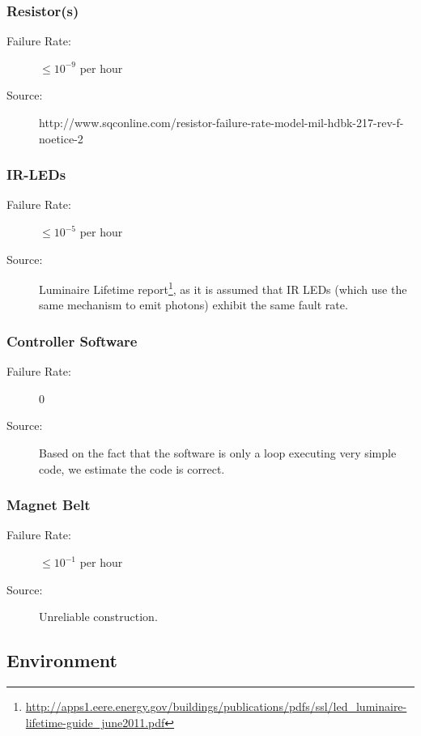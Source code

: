 \documentclass[a4paper,parskip,headheight=38pt]{scrartcl} %
\begin{document}
\subsubsection{Resistor(s)}
\begin{description}
\item[Failure Rate:] $\leq 10^{-9}$ per hour
\item[Source:] http://www.sqconline.com/resistor-failure-rate-model-mil-hdbk-217-rev-f-noetice-2
\end{description}

\subsubsection{IR-LEDs}
\begin{description}
\item[Failure Rate:] $\leq 10^{-5}$ per hour
\item[Source:] Luminaire Lifetime report\footnote{\url{http://apps1.eere.energy.gov/buildings/publications/pdfs/ssl/led\_luminaire-lifetime-guide\_june2011.pdf}}, as it is assumed that IR LEDs (which use the same mechanism to emit photons) exhibit the same fault rate.
\end{description}

\subsubsection{Controller Software}
\begin{description}
\item[Failure Rate:] $0$
\item[Source:] Based on the fact that the software is only a loop
executing very simple code, we estimate the code is correct.
\end{description}

\subsubsection{Magnet Belt}
\begin{description}
\item[Failure Rate:] $\leq 10^{-1}$ per hour
\item[Source:] Unreliable construction.
\end{description}


\subsection{Environment} %
\end{document}
